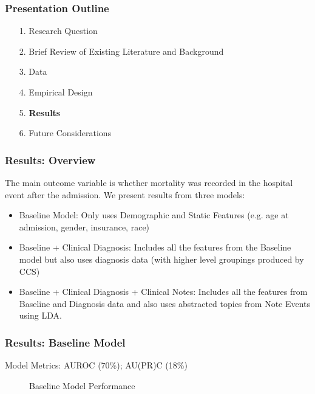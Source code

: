 \documentclass{beamer}
\begin{document}
\begin{frame}
\label{Presentation Outline 6}
\frametitle{Presentation Outline}
\begin{enumerate}
\item[1.] Research Question
\newline
\item[2.] Brief Review of Existing Literature and Background
\newline
\item[3.] Data
\newline
\item[4.] Empirical Design
\newline
\item[5.] \textbf{Results}
\newline
\item[6.] Future Considerations
\end{enumerate}
\end{frame}

\begin{frame}
\label{Results: Overview}
\frametitle{Results: Overview}
The main outcome variable is whether mortality was recorded in the hospital event after the admission. We present results from three models:

\begin{itemize}
\item Baseline Model: Only uses Demographic and Static Features (e.g. age at admission, gender, insurance, race)
\item Baseline + Clinical Diagnosis: Includes all the features from the Baseline model but also uses diagnosis data (with higher level groupings produced by CCS)
\item Baseline + Clinical Diagnosis + Clinical Notes: Includes all the features from Baseline and Diagnosis data and also uses abstracted topics from Note Events using LDA.
\end{itemize}
\end{frame}

\begin{frame}
\frametitle{Results: Baseline Model}

Model Metrics: AUROC (70\%); AU(PR)C (18\%)

\begin{figure}[H]
\centering     %
{}
\caption{Baseline Model Performance}
\label{BaselineModelPerformance}
\end{figure}
\end{frame}
\end{document}
